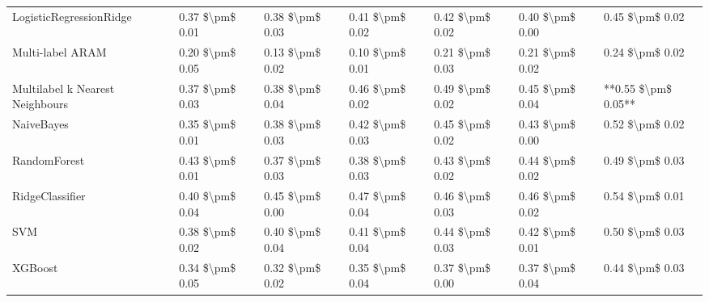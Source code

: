 \begin{tabular}{lllllll}
        LogisticRegressionRidge & 0.37 \$\textbackslash pm\$ 0.01 &           0.38 \$\textbackslash pm\$ 0.03 &       0.41 \$\textbackslash pm\$ 0.02 &        0.42 \$\textbackslash pm\$ 0.02 &                         0.40 \$\textbackslash pm\$ 0.00 &     0.45 \$\textbackslash pm\$ 0.02 \\
               Multi-label ARAM & 0.20 \$\textbackslash pm\$ 0.05 &           0.13 \$\textbackslash pm\$ 0.02 &       0.10 \$\textbackslash pm\$ 0.01 &        0.21 \$\textbackslash pm\$ 0.03 &                         0.21 \$\textbackslash pm\$ 0.02 &     0.24 \$\textbackslash pm\$ 0.02 \\
Multilabel k Nearest Neighbours & 0.37 \$\textbackslash pm\$ 0.03 &           0.38 \$\textbackslash pm\$ 0.04 &       0.46 \$\textbackslash pm\$ 0.02 &        0.49 \$\textbackslash pm\$ 0.02 &                         0.45 \$\textbackslash pm\$ 0.04 & **0.55 \$\textbackslash pm\$ 0.05** \\
                     NaiveBayes & 0.35 \$\textbackslash pm\$ 0.01 &           0.38 \$\textbackslash pm\$ 0.03 &       0.42 \$\textbackslash pm\$ 0.03 &        0.45 \$\textbackslash pm\$ 0.02 &                         0.43 \$\textbackslash pm\$ 0.00 &     0.52 \$\textbackslash pm\$ 0.02 \\
                   RandomForest & 0.43 \$\textbackslash pm\$ 0.01 &           0.37 \$\textbackslash pm\$ 0.03 &       0.38 \$\textbackslash pm\$ 0.03 &        0.43 \$\textbackslash pm\$ 0.02 &                         0.44 \$\textbackslash pm\$ 0.02 &     0.49 \$\textbackslash pm\$ 0.03 \\
                RidgeClassifier & 0.40 \$\textbackslash pm\$ 0.04 &           0.45 \$\textbackslash pm\$ 0.00 &       0.47 \$\textbackslash pm\$ 0.04 &        0.46 \$\textbackslash pm\$ 0.03 &                         0.46 \$\textbackslash pm\$ 0.02 &     0.54 \$\textbackslash pm\$ 0.01 \\
                            SVM & 0.38 \$\textbackslash pm\$ 0.02 &           0.40 \$\textbackslash pm\$ 0.04 &       0.41 \$\textbackslash pm\$ 0.04 &        0.44 \$\textbackslash pm\$ 0.03 &                         0.42 \$\textbackslash pm\$ 0.01 &     0.50 \$\textbackslash pm\$ 0.03 \\
                        XGBoost & 0.34 \$\textbackslash pm\$ 0.05 &           0.32 \$\textbackslash pm\$ 0.02 &       0.35 \$\textbackslash pm\$ 0.04 &        0.37 \$\textbackslash pm\$ 0.00 &                         0.37 \$\textbackslash pm\$ 0.04 &     0.44 \$\textbackslash pm\$ 0.03 \\
\bottomrule
\end{tabular}
